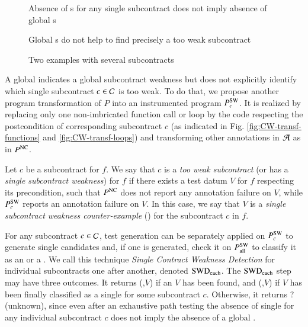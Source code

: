 \begin{figure}[tb]
  \begin{minipage}{0.5\columnwidth}
    
    \caption{Absence of \CWCE{}s for any single subcontract does not imply absence of global \CWCE{}s}
    \label{fig:contracts-ex1}
  \end{minipage}
  \hspace{4mm}
  \begin{minipage}{0.5\columnwidth}
    
    \caption{Global \CWCE{}s do not help to find precisely a too weak subcontract}
    \label{fig:contracts-ex2}
  \end{minipage}
  \caption{Two examples with several subcontracts}
  \label{fig:many-contracts}
\end{figure}


A global \CWCE indicates a global subcontract weakness but
does not explicitly identify which single subcontract $c\in{\ensuremath\mathcal{C}}$ is too 
weak.
To do that, we propose another program transformation of $P$ into
an instrumented program  $P_c^{\mathrm{SW}}$.
It is realized by replacing only one non-imbricated function call or loop 
by the code respecting the postcondition of corresponding subcontract $c$ 
(as indicated in Fig. \ref{fig:CW-transf-functions} and \ref{fig:CW-transf-loops})
and transforming other annotations in ${\mathcal{A}}$ as in $P^{\mathrm{NC}}$.

\begin{definition} 
\label{def:CW}
Let $c$ be a subcontract for $f$.
We say that $c$ is a \emph{too weak subcontract}
(or has a \emph{single subcontract weakness}) for $f$ 
if there exists a test datum $V$ for $f$ respecting its precondition,
such that $P^{\mathrm{NC}}$ does not report any annotation failure on $V$,
while $P_c^{\mathrm{SW}}$ reports an annotation failure on $V$.
In this case, we say that $V$ is a \emph{single subcontract weakness counter-example} (\CWCE)
for the subcontract  $c$ in $f$.
\end{definition}

For any subcontract $c\in{\ensuremath\mathcal{C}}$, test generation can be separately applied on  $P_{c}^{\mathrm{SW}}$ to generate
single \CWCE candidates and, if one is generated, check it on $P_{\mathrm{all}}^{\mathrm{SW}}$ to 
classify it as an \NCCE or a \CWCE.
We call this technique \emph{Single Contract Weakness Detection}
for individual subcontracts one after another, denoted $\mathrm{SWD}_{\mathrm{each}}$. 
The $\mathrm{SWD}_{\mathrm{each}}$ step may have three outcomes. 
It returns (\nc,$V$) if an \NCCE $V$ has been found,
and (\cw,$V$) if $V$ has been finally classified as a single \CWCE for some subcontract $c$.
Otherwise, it returns \textsf{?} (unknown), since even after an exhaustive path testing
the absence of single \CWCE for any individual subcontract $c$ does not imply
the absence of a global \CWCE.

